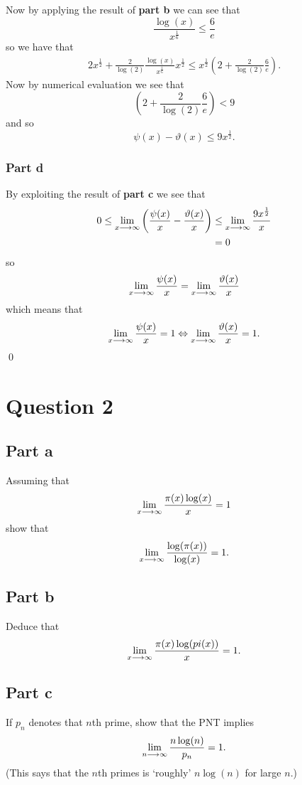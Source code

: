 \documentclass{unswmaths}
\begin{document}
Now by applying the result of \textbf{part b} we can see that
$$
	\frac{\log(x)}{x^\frac{1}{6}} \leq \frac{6}{e}
$$
so we have that 
\begin{align*}
	2x^\frac{1}{2} + \frac{2}{\log(2)} \frac{\log(x)}{x^\frac{1}{6}} x^\frac{1}{2} \leq x^\frac{1}{2} \left( 2 + \frac{2}{\log(2)} \frac{6}{e} \right).
\end{align*}
Now by numerical evaluation we see that 
$$
	\left( 2 + \frac{2}{\log(2)} \frac{6}{e} \right) < 9
$$
and so 
$$
	\psi(x) - \vartheta(x) \leq 9x^\frac{1}{2}.
$$

\subsubsection*{Part d}
By exploiting the result of \textbf{part c} we see that
\begin{align*}
	0 \leq \lim_{x \longrightarrow \infty} \left( \frac{\psi(x)}{x} - \frac{\vartheta(x)}{x}\right) &\leq \lim_{x \longrightarrow \infty} \frac{9x^\frac{1}{2}}{x} \\
		&= 0
\end{align*}
so 
$$
	\lim_{x \longrightarrow \infty} \frac{\psi(x)}{x} = \lim_{x \longrightarrow \infty} \frac{\vartheta(x)}{x}
$$
which means that
$$
	\lim_{x \longrightarrow \infty} \frac{\psi(x)}{x} = 1 \Leftrightarrow \lim_{x \longrightarrow \infty} \frac{\vartheta(x)}{x} = 1.
$$
\qed
\section*{Question 2}

\subsection*{Part a}
Assuming that 
$$
	\lim_{x \longrightarrow \infty} \frac{\pi(x)\log(x)}{x} = 1
$$
show that
$$
	\lim_{x \longrightarrow \infty} \frac{\log(\pi(x))}{\log(x)} = 1.
$$
\subsection*{Part b}
Deduce that 
$$
	\lim_{x \longrightarrow \infty} \frac{\pi(x)\log(pi(x))}{x} = 1.
$$

\subsection*{Part c}
If $ p_n $ denotes that $n$th prime, show that the PNT implies 
$$
	\lim_{n \longrightarrow \infty } \frac{n \log(n)}{p_n} = 1.
$$
(This says that the $n$th primes is `roughly' $ n\log(n) $ for large $n$.)
\end{document}
